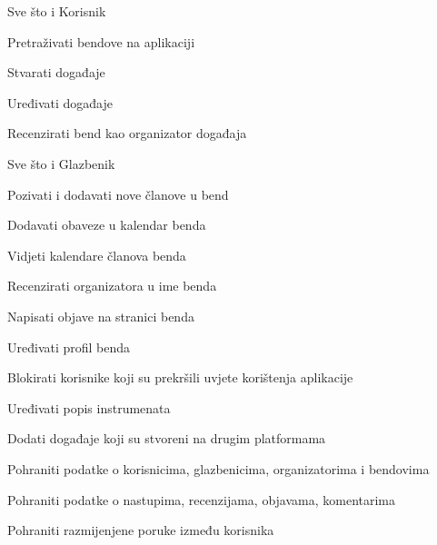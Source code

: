 \begin{packed_enum}
		\item  {}
			
			\begin{packed_enum}
				
				\item Sve što i Korisnik
				\item Pretraživati bendove na aplikaciji
				\item Stvarati događaje
				\item Uređivati događaje
				\item Recenzirati bend kao organizator događaja
			\end{packed_enum}
			
		\item  {}
			
			\begin{packed_enum}
				
				\item Sve što i Glazbenik
				\item Pozivati i dodavati nove članove u bend
				\item Dodavati obaveze u kalendar benda
				\item Vidjeti kalendare članova benda
				\item Recenzirati organizatora u ime benda
				\item Napisati objave na stranici benda
				\item Uređivati profil benda
			\end{packed_enum}
			
		\item  {}
			
			\begin{packed_enum}
				
				\item Blokirati korisnike koji su prekršili uvjete korištenja aplikacije
				\item Uređivati popis instrumenata
				\item Dodati događaje koji su stvoreni na drugim platformama
				
			\end{packed_enum}
			
		\item  {}
			
			\begin{packed_enum}
				
				\item Pohraniti podatke o korisnicima, glazbenicima, organizatorima i bendovima
				\item Pohraniti podatke o nastupima, recenzijama, objavama, komentarima
				\item Pohraniti razmijenjene poruke između korisnika 
				
			\end{packed_enum}
		
		\end{packed_enum}
			
